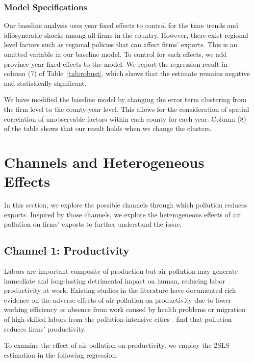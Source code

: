 \documentclass[12pt]{article}
\begin{document}
\subsubsection{Model Specifications}
Our baseline analysis uses year fixed effects to control for the time trends
and idiosyncratic shocks among all firms in the country. However, there
exist regional-level factors such as regional policies that can affect
firms' exports. This is an omitted variable in our baseline model. To
control for such effects, we add province-year fixed effects to the model.
We report the regression result in column (7) of Table~\ref{tab:robust},
which shows that the estimate remains negative and statistically
significant.

We have modified the baseline model by changing the error term clustering from the firm level to the county-year level. This allows for the consideration of spatial correlation of unobservable factors within each county for each year. Column (8) of the table shows that our result holds when we change the clusters.

\section{Channels and Heterogeneous Effects}
\label{sec:5} %

In this section, we explore the possible channels through which pollution
reduces exports. Inspired by those channels, we explore the heterogeneous
effects of air pollution on firms' exports to further understand the issue. 

\subsection{Channel 1: Productivity}
\label{sec:5.1} 
Labors are important composite of production but air
pollution may generate immediate and long-lasting detrimental impact on
human, reducing labor productivity at work. Existing studies in the
literature have documented rich evidence on the adverse effects of air
pollution on productivity due to lower working efficiency or absence from
work caused by health problems %
\citep{chang2016particulate,fu2021air,somanathan2021impact} or migration of
high-skilled labors from the pollution-intensive cities %
\citep{chen2022effect,NBERw28401}. %
\citep{fu2021air,somanathan2021impact,chang2016particulate,adhvaryu2022management}
find that pollution reduces firms' productivity.

To examine the effect of air pollution on productivity, we
employ the 2SLS estimation in the following regression:
\end{document}
